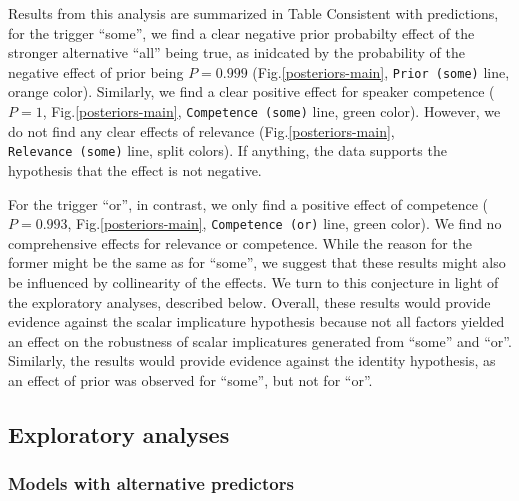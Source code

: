 \documentclass{sp}
\begin{document}
Results from this analysis are summarized in Table
Consistent with predictions, for the trigger ``some'', we find a clear negative prior probabilty effect of the stronger alternative ``all'' being true, as inidcated by the probability of the negative effect of prior being $P = 0.999$ (Fig.\ref{posteriors-main}, \texttt{Prior~(some)} line, orange color). Similarly, we find a clear positive effect for speaker competence ($P =  1$, Fig.\ref{posteriors-main}, \texttt{Competence~(some)} line, green color). However, we do not find any clear effects of relevance (Fig.\ref{posteriors-main}, \texttt{Relevance~(some)} line, split colors). If anything, the data supports the hypothesis that the effect is not negative.


For the trigger ``or'', in contrast, we only find a positive effect of competence ($P =  0.993$, Fig.\ref{posteriors-main}, \texttt{Competence~(or)} line, green color).  We find no comprehensive effects for relevance or competence. While the reason for the former might be the same as for ``some'', we suggest that these results might also be influenced by collinearity of the effects. We turn to this conjecture in light of the exploratory analyses, described below. 
Overall, these results would provide evidence against the scalar implicature hypothesis because not all factors yielded an effect on the robustness of scalar implicatures generated from ``some'' and ``or''. Similarly, the results would provide evidence against the identity hypothesis, as an effect of prior was observed for ``some'', but not for ``or''.

\subsection{Exploratory analyses}

\subsubsection{Models with alternative predictors}
\end{document}
